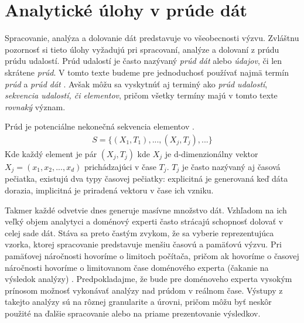 \chapter{Analytické úlohy v prúde dát}
\label{Analytické úlohy v prúde dát}
Spracovanie, analýza a dolovanie dát predstavuje vo všeobecnosti výzvu. Zvláštnu pozornosť si tieto úlohy vyžadujú pri spracovaní, analýze a dolovaní z prúdu prúdu udalostí. Prúd udalostí je často nazývaný \textit{prúd dát} alebo \textit{údajov}, či len skrátene \textit{prúd}. V tomto texte budeme pre jednoduchosť používať najmä termín \textit{prúd} a \textit{prúd dát} \citep{tran2014change}. Avšak môžu sa vyskytnúť aj terminý ako \textit{prúd udalostí}, \textit{sekvencia udalostí, či elementov}, pričom všetky termíny majú v tomto texte \textit{rovnaký} význam.\\
\begin{definition}{Prúd je potenciálne nekonečná sekvencia elementov \citep{tran2014change}.}
\begin{align*}
	S = \{(X_1,T_1), ..., (X_j,T_j), ...\}
\end{align*}
Kde každý element je pár $(X_j,T_j)$ kde $X_j$ je d-dimenzionálny vektor $X_j = (x_1, x_2, ..., x_d)$ prichádzajúci v čase $T_j$. $T_j$ je často nazývaný aj časová pečiatka, existujú dva typy časovej pečiatky: explicitná je generovaná keď dáta dorazia, implicitná je priradená vektoru v čase ich vzniku.
\end{definition}

Takmer každé odvetvie dnes generuje masívne množstvo dát. Vzhľadom na ich veľký objem analytyci a doménový experti často strácajú schopnosť dolovať v celej sade dát. Stáva sa preto častým zvykom, že sa vyberie reprezentujúca vzorka, ktorej spracovanie predstavuje menšiu časovú a pamäťovú výzvu. Pri pamäťovej náročnosti hovoríme o limitoch počítača, pričom ak hovoríme o časovej náročnosti hovoríme o limitovanom čase doménového experta (čakanie na výsledok analýzy) \citep{hulten2001mining}. Predpokladajme, že bude pre doménoveho experta vysokým prínosom možnosť vykonávať analýzy nad prúdom v reálnom čase. Výstupy z takejto analýzy sú na rôznej granularite a úrovni, pričom môžu byť neskôr použité na ďalšie spracovanie alebo na priame prezentovanie výsledkov.\\

